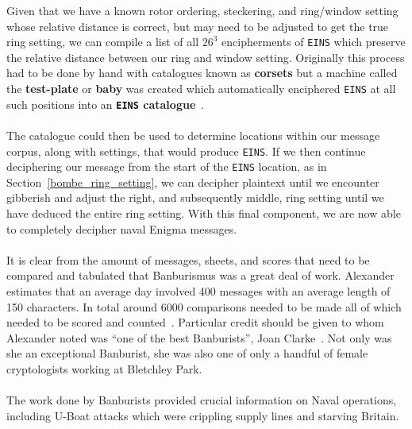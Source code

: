 \noindent Given that we have a known rotor ordering, steckering,
and ring/window setting whose relative distance is correct, but may
need to be adjusted to get the true ring setting, we can compile a
list of all $26^3$ encipherments of \texttt{EINS} which preserve
the relative distance between our ring and window setting.
Originally this process had to be done by hand with catalogues
known as {\bf{corsets}} but a machine called the {\bf{test-plate}}
or {\bf{baby}} was created which automatically enciphered
\texttt{EINS} at all such positions into an {\bf{\texttt{EINS} catalogue}}~\cite[pp.~140--142]{Turing1940ProfBook}.
\\\\The catalogue could then be used to determine locations within our
message corpus, along with settings, that would produce
\texttt{EINS}. If we then continue deciphering our message from the
start of the \texttt{EINS} location, as in
Section~\ref{bombe_ring_setting}, we can decipher plaintext until we
encounter gibberish and adjust the right, and subsequently middle, ring setting
until we have deduced the entire ring setting. With this final
component, we are now able to completely decipher naval Enigma messages.
\\\\It is clear from the amount of messages, sheets, and scores
that need to be compared and tabulated that Banburismus was a great
deal of work. Alexander estimates that an average day involved 400
messages with an average length of 150 characters. In total around
6000 comparisons needed to be made all of which needed to be scored
and counted~\cite[p.~109]{Alexander1945}. Particular credit should be given to whom Alexander
noted was ``one of the best Banburists'', Joan Clarke~\cite[p.~73]{Alexander1945}. Not only was
she an exceptional Banburist, she was also one of only a handful of
female cryptologists working at Bletchley Park.
\\\\The work done by Banburists provided crucial information on
Naval operations, including U-Boat attacks which were crippling
supply lines and starving Britain.

